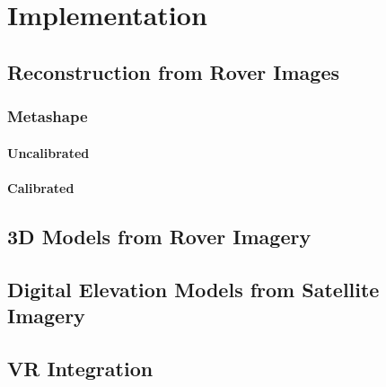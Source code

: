 \newpage
\chapter{Implementation}
\section{Reconstruction from Rover Images}


\subsection{Metashape}
\subsubsection{Uncalibrated}



\subsubsection{Calibrated}


\section{3D Models from Rover Imagery}

\section{Digital Elevation Models from Satellite Imagery}

\section{VR Integration}

